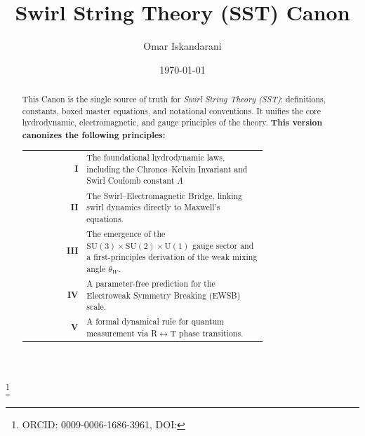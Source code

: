 \documentclass[10pt,reprint,aps,onecolumn,nofootinbib]{revtex4-2}
\newcommand{\Lam}{\Lambda}                               %
\begin{document}
	\title{Swirl String Theory (SST) Canon \canonversion}
	\author{Omar Iskandarani}
    \thanks{ORCID: 0009-0006-1686-3961, DOI: \paperdoi}
	\date{\today}

    \begin{abstract}
    This Canon is the single source of truth for \emph{Swirl String Theory (SST)}: definitions, constants, boxed master equations, and notational conventions. It unifies the core hydrodynamic, electromagnetic, and gauge principles of the theory.
    \textbf{This version canonizes the following principles:}

    \begin{tabular}{r@{\quad}p{0.75\linewidth}}
        \textbf{I} & The foundational hydrodynamic laws, including the Chronos–Kelvin Invariant and Swirl Coulomb constant $\Lam$ \\
        \textbf{II} & The Swirl–Electromagnetic Bridge, linking swirl dynamics directly to Maxwell's equations.\\
        \textbf{III} & The emergence of the $\mathrm{SU}(3)\times\mathrm{SU}(2)\times\mathrm{U}(1)$ gauge sector and a first-principles derivation of the weak mixing angle $\theta_W$.\\
        \textbf{IV} & A parameter-free prediction for the Electroweak Symmetry Breaking (EWSB) scale. \\
        \textbf{V} & A formal dynamical rule for quantum measurement via R$\leftrightarrow$T phase transitions. \\
    \end{tabular}



\end{abstract}
\end{document}
